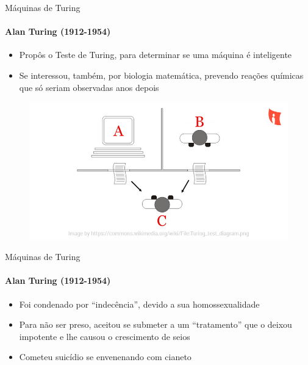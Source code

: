 \documentclass{beamer}
\begin{document}
\begin{frame}{Máquinas de Turing}
	\framesubtitle{Alan Turing (1912-1954)}
	\begin{itemize}
		\item Propôs o \alert{Teste de Turing}, para determinar se uma máquina é inteligente
		\item Se interessou, também, por biologia matemática, prevendo reações químicas que só seriam observadas anos depois
	\end{itemize}
	\begin{figure}
		\includegraphics[width=0.5\paperwidth]{resources/turingtest}
	\end{figure}
\end{frame}
\begin{frame}{Máquinas de Turing}
	\framesubtitle{Alan Turing (1912-1954)}
	\begin{itemize}
		\item Foi condenado por ``indecência'', devido a sua homossexualidade
		\item Para não ser preso, aceitou se submeter a um ``tratamento'' que o deixou impotente e lhe causou o crescimento de seios
		\item Cometeu suicídio se envenenando com cianeto
	\end{itemize}
\end{frame}
\end{document}
